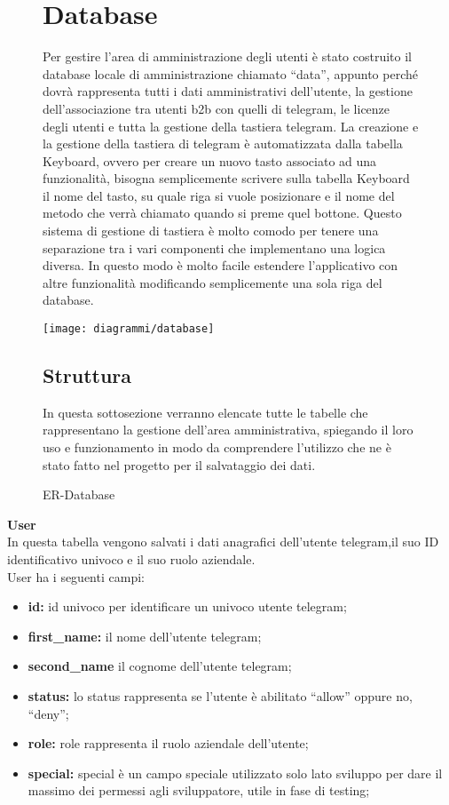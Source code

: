 \begin{figure}[h!]
\section{Database}
\label{sec:database}

Per gestire l’area di amministrazione degli utenti è stato costruito il database locale di amministrazione chiamato “data”, appunto perché dovrà rappresenta tutti i dati amministrativi dell’utente, la gestione dell’associazione tra utenti b2b con quelli di telegram, le licenze degli utenti e tutta la gestione della tastiera telegram. La creazione e la  gestione della tastiera di telegram è automatizzata dalla tabella Keyboard, ovvero per creare un nuovo tasto associato ad una funzionalità, bisogna semplicemente scrivere sulla tabella Keyboard il nome del tasto, su quale riga si vuole posizionare e il nome del metodo che verrà chiamato quando si preme quel bottone. Questo sistema di gestione di tastiera è molto comodo per tenere una separazione tra i vari componenti che implementano una logica diversa. In questo modo è molto facile estendere l’applicativo con altre funzionalità modificando semplicemente una sola riga del database. 

   \begin{center}
     \texttt{[image: diagrammi/database]} 
    \caption{ER-Database }
    \end{center}

\subsection{Struttura}
In questa sottosezione verranno elencate tutte le tabelle che rappresentano la gestione dell’area amministrativa, spiegando il loro uso e funzionamento in modo da comprendere l’utilizzo che ne è stato fatto nel progetto per il salvataggio dei dati. \\
\end{figure}
\textbf{User} \\ 

In questa tabella vengono salvati i dati anagrafici dell’utente telegram,il suo ID identificativo univoco e il suo ruolo aziendale. \\

User ha i seguenti campi: \\ 
\begin{itemize}
\item \textbf{id:}  id univoco per identificare un univoco utente telegram;
\item \textbf{first\_name:} il nome dell’utente telegram;
\item \textbf{second\_name } il cognome dell’utente telegram;
\item \textbf{status:} lo status rappresenta se l’utente è abilitato “allow” oppure no, “deny”;
\item \textbf{role:} role rappresenta il ruolo aziendale dell’utente;
\item \textbf{special:} special è un campo speciale utilizzato solo lato sviluppo per dare il massimo dei  permessi agli sviluppatore, utile in fase di testing;
\end{itemize}

